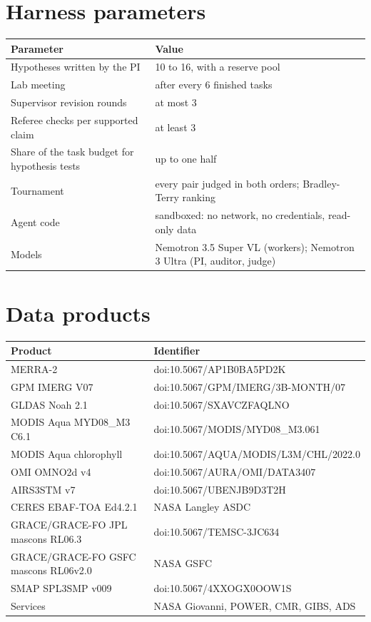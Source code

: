 \documentclass[11pt,a4paper]{article}
\begin{document}
\section{Harness parameters}
\label{app:params}
\begin{center}\small
\begin{tabularx}{\linewidth}{@{}lX@{}}
  \toprule
  Parameter & Value \\
  \midrule
  Hypotheses written by the PI & 10 to 16, with a reserve pool \\
  Lab meeting & after every 6 finished tasks \\
  Supervisor revision rounds & at most 3 \\
  Referee checks per supported claim & at least 3 \\
  Share of the task budget for hypothesis tests & up to one half \\
  Tournament & every pair judged in both orders; Bradley-Terry ranking \\
  Agent code & sandboxed: no network, no credentials, read-only data \\
  Models & Nemotron 3.5 Super VL (workers); Nemotron 3 Ultra (PI, auditor, judge) \\
  \bottomrule
\end{tabularx}
\end{center}

\section{Data products}
\label{app:data}
\begin{center}\small
\begin{tabularx}{\linewidth}{@{}l X@{}}
  \toprule
  Product & Identifier \\
  \midrule
  MERRA-2 & doi:10.5067/AP1B0BA5PD2K \\
  GPM IMERG V07 & doi:10.5067/GPM/IMERG/3B-MONTH/07 \\
  GLDAS Noah 2.1 & doi:10.5067/SXAVCZFAQLNO \\
  MODIS Aqua MYD08\_M3 C6.1 & doi:10.5067/MODIS/MYD08\_M3.061 \\
  MODIS Aqua chlorophyll & doi:10.5067/AQUA/MODIS/L3M/CHL/2022.0 \\
  OMI OMNO2d v4 & doi:10.5067/AURA/OMI/DATA3407 \\
  AIRS3STM v7 & doi:10.5067/UBENJB9D3T2H \\
  CERES EBAF-TOA Ed4.2.1 & NASA Langley ASDC \\
  GRACE/GRACE-FO JPL mascons RL06.3 & doi:10.5067/TEMSC-3JC634 \\
  GRACE/GRACE-FO GSFC mascons RL06v2.0 & NASA GSFC \\
  SMAP SPL3SMP v009 & doi:10.5067/4XXOGX0OOW1S \\
  Services & NASA Giovanni, POWER, CMR, GIBS, ADS \\
  \bottomrule
\end{tabularx}
\end{center}
\end{document}
